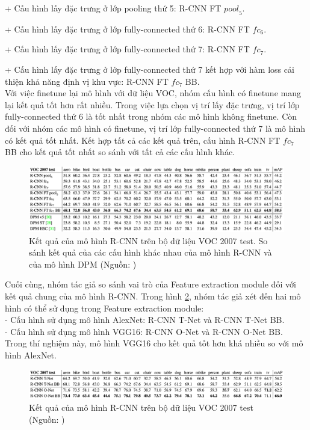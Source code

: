 {        + Cấu hình lấy đặc trưng ở lớp pooling thứ 5: R-CNN FT ${pool}_{5}$. \par
        + Cấu hình lấy đặc trưng ở lớp fully-connected thứ 6: R-CNN FT ${fc}_{6}$. \par
        + Cấu hình lấy đặc trưng ở lớp fully-connected thứ 7: R-CNN FT ${fc}_{7}$. \par
        + Cấu hình lấy đặc trưng ở lớp fully-connected thứ 7 kết hợp với hàm loss cải thiện khả năng định vị khu vực: R-CNN FT ${fc}_{7}$ BB. \\
        Với việc finetune lại mô hình với dữ liệu VOC, nhóm cấu hình có finetune mang lại kết quả tốt hơn rất nhiều.
        Trong việc lựa chọn vị trí lấy đặc trưng, vị trí lớp fully-connected thứ 6 là tốt nhất trong nhóm các mô hình không finetune.
        Còn đối với nhóm các mô hình có finetune, vị trí lớp fully-connected thứ 7 là mô hình có kết quả tốt nhất.
        Kết hợp tất cả các kết quả trên, cấu hình R-CNN FT ${fc}_{7}$ BB cho kết quả tốt nhất so sánh với tất cả các cấu hình khác.
        \begin{figure}[H]
            \centering
            \includegraphics[width=15cm] {images/rcnn_results_1}
            \caption{Kết quả của mô hình R-CNN trên bộ dữ liệu VOC 2007 test. So sánh kết quả của các cấu hình khác nhau của mô hình R-CNN và của mô hình DPM (Nguồn: \cite{girshick2014rich})}
            \label{fig:rcnn_results_1}
        \end{figure}
        \noindent
        Cuối cùng, nhóm tác giả so sánh vai trò của Feature extraction module đối với kết quả chung của mô hình R-CNN.
        Trong hình \ref{fig:rcnn_results_2}, nhóm tác giả xét đến hai mô hình có thể sử dụng trong Feature extraction module: \\
        - Cấu hình sử dụng mô hình AlexNet: R-CNN T-Net và R-CNN T-Net BB. \\
        - Cấu hình sử dụng mô hình VGG16: R-CNN O-Net và R-CNN O-Net BB. \\
        Trong thí nghiệm này, mô hình VGG16 cho kết quả tốt hơn khá nhiều so với mô hình AlexNet.
        \begin{figure}[H]
            \centering
            \includegraphics[width=15cm] {images/rcnn_results_2}
            \caption{Kết quả của mô hình R-CNN trên bộ dữ liệu VOC 2007 test (Nguồn: \cite{girshick2014rich})}
            \label{fig:rcnn_results_2}
        \end{figure}

}
